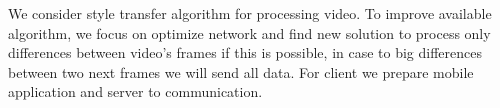 \documentclass[../Main.tex]{subfiles}
\begin{document}
We consider style transfer algorithm for processing video. To improve available algorithm, we focus on optimize network and find new solution to process only differences between video's frames if this is possible, in case to big differences between two next frames we will send all data. For client we prepare mobile application and server to communication.

\par\vspace*{\fill} %


\biblio %
\end{document}
